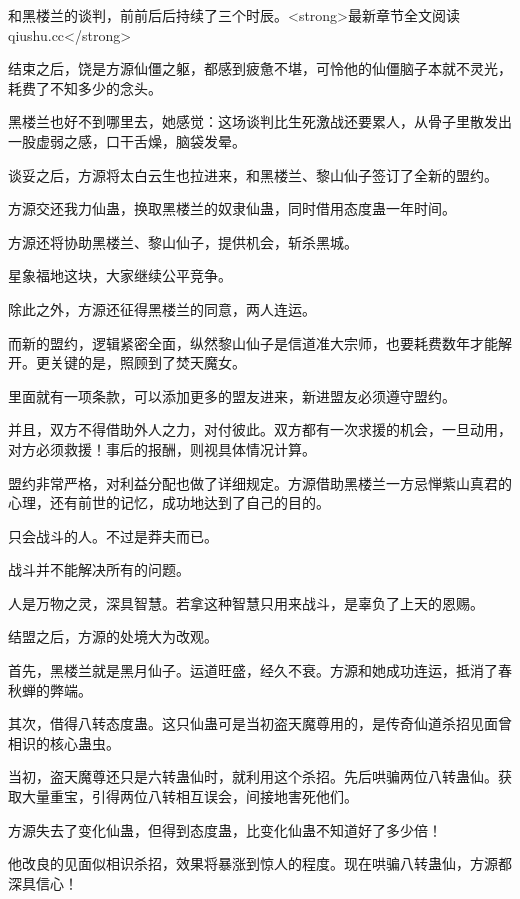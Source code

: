 
\begin{this_body}

和黑楼兰的谈判，前前后后持续了三个时辰。<strong>最新章节全文阅读qiushu.cc</strong>

结束之后，饶是方源仙僵之躯，都感到疲惫不堪，可怜他的仙僵脑子本就不灵光，耗费了不知多少的念头。

黑楼兰也好不到哪里去，她感觉：这场谈判比生死激战还要累人，从骨子里散发出一股虚弱之感，口干舌燥，脑袋发晕。

谈妥之后，方源将太白云生也拉进来，和黑楼兰、黎山仙子签订了全新的盟约。

方源交还我力仙蛊，换取黑楼兰的奴隶仙蛊，同时借用态度蛊一年时间。

方源还将协助黑楼兰、黎山仙子，提供机会，斩杀黑城。

星象福地这块，大家继续公平竞争。

除此之外，方源还征得黑楼兰的同意，两人连运。

而新的盟约，逻辑紧密全面，纵然黎山仙子是信道准大宗师，也要耗费数年才能解开。更关键的是，照顾到了焚天魔女。

里面就有一项条款，可以添加更多的盟友进来，新进盟友必须遵守盟约。

并且，双方不得借助外人之力，对付彼此。双方都有一次求援的机会，一旦动用，对方必须救援！事后的报酬，则视具体情况计算。

盟约非常严格，对利益分配也做了详细规定。方源借助黑楼兰一方忌惮紫山真君的心理，还有前世的记忆，成功地达到了自己的目的。

只会战斗的人。不过是莽夫而已。

战斗并不能解决所有的问题。

人是万物之灵，深具智慧。若拿这种智慧只用来战斗，是辜负了上天的恩赐。

结盟之后，方源的处境大为改观。

首先，黑楼兰就是黑月仙子。运道旺盛，经久不衰。方源和她成功连运，抵消了春秋蝉的弊端。

其次，借得八转态度蛊。这只仙蛊可是当初盗天魔尊用的，是传奇仙道杀招见面曾相识的核心蛊虫。

当初，盗天魔尊还只是六转蛊仙时，就利用这个杀招。先后哄骗两位八转蛊仙。获取大量重宝，引得两位八转相互误会，间接地害死他们。

方源失去了变化仙蛊，但得到态度蛊，比变化仙蛊不知道好了多少倍！

他改良的见面似相识杀招，效果将暴涨到惊人的程度。现在哄骗八转蛊仙，方源都深具信心！


\end{this_body}
